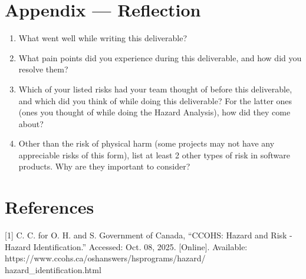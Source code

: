 \documentclass{article}
\begin{document}
\section*{Appendix --- Reflection}




\begin{enumerate}
    \item What went well while writing this deliverable? 
    \item What pain points did you experience during this deliverable, and how
    did you resolve them?
    \item Which of your listed risks had your team thought of before this
    deliverable, and which did you think of while doing this deliverable? For
    the latter ones (ones you thought of while doing the Hazard Analysis), how
    did they come about?
    \item Other than the risk of physical harm (some projects may not have any
    appreciable risks of this form), list at least 2 other types of risk in
    software products. Why are they important to consider?
\end{enumerate}

\section*{References}

[1]  C. C. for O. H. and S. Government of Canada, “CCOHS: Hazard and Risk - Hazard Identification.”
Accessed: Oct. 08, 2025. [Online]. Available: https://www.ccohs.ca/oshanswers/hsprograms/hazard/
hazard_identification.html
\end{document}
